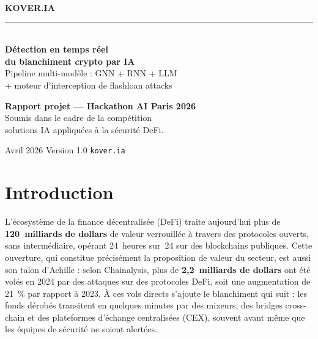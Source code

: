 \documentclass[11pt,a4paper]{article}
\begin{document}
\begin{titlepage}
\centering
\vspace*{2.5cm}

{\sffamily\Huge\bfseries\color{kvink} KOVER.IA}\\[0.2cm]
{\sffamily\Large\color{kvgold} \rule{4cm}{1pt}}\\[0.4cm]

{\sffamily\LARGE\bfseries Détection en temps réel \\[0.2cm] du blanchiment crypto par IA}\\[1.0cm]

{\sffamily\large\color{kvgrey} Pipeline multi-modèle : GNN + RNN + LLM\\[0.1cm]
+ moteur d'interception de flashloan attacks}\\[3.2cm]

\begin{tcolorbox}[
  enhanced, colback=kvbg, colframe=kvink,
  boxrule=0.5pt, arc=2pt, width=12cm,
  left=12pt, right=12pt, top=10pt, bottom=10pt,
  fontupper=\sffamily
]
\centering
\textbf{Rapport projet --- Hackathon AI Paris 2026}\\[0.4cm]
\small Soumis dans le cadre de la compétition \\
solutions IA appliquées à la sécurité DeFi.
\end{tcolorbox}

\vfill

{\sffamily\color{kvgrey}\small Avril 2026 \quad\textbar\quad Version 1.0 \quad\textbar\quad \texttt{kover.ia}}
\end{titlepage}

\renewcommand{\contentsname}{Table des matières}
{\sffamily\tableofcontents}
\thispagestyle{fancy}
\newpage

\section{Introduction}

L'écosystème de la finance décentralisée (DeFi) traite aujourd'hui plus de
\textbf{120~milliards de dollars} de valeur verrouillée à travers des
protocoles ouverts, sans intermédiaire, opérant 24~heures sur~24 sur des
blockchains publiques. Cette ouverture, qui constitue précisément la
proposition de valeur du secteur, est aussi son talon d'Achille : selon
Chainalysis, plus de \textbf{2,2~milliards de dollars} ont été volés en
2024 par des attaques sur des protocoles DeFi, soit une augmentation de
21~\% par rapport à 2023. À ces vols directs s'ajoute le blanchiment qui
suit : les fonds dérobés transitent en quelques minutes par des mixeurs,
des bridges cross-chain et des plateformes d'échange centralisées (CEX),
souvent avant même que les équipes de sécurité ne soient alertées.
\end{document}
